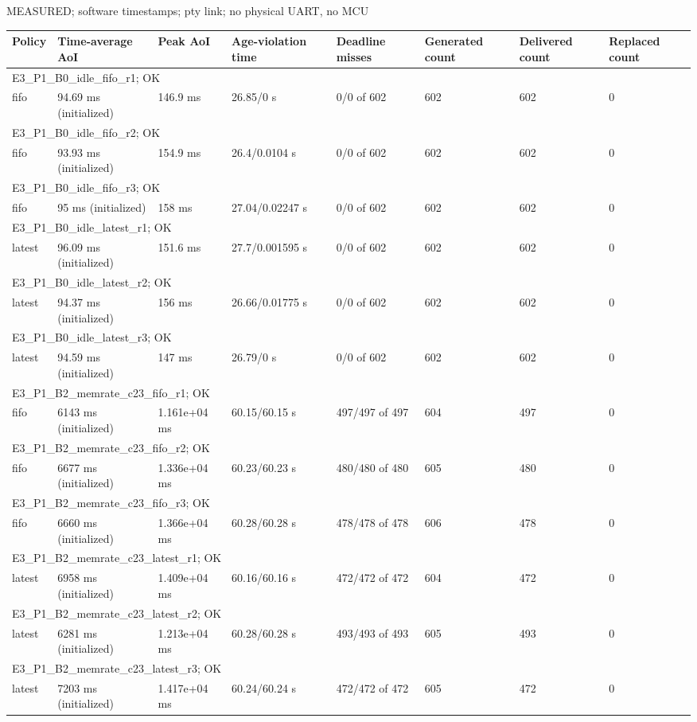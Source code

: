 \par\noindent MEASURED; software timestamps; pty link; no physical UART, no MCU\par
\begin{tabular}{llllllll}
\toprule
Policy & Time-average AoI & Peak AoI & Age-violation time & Deadline misses & Generated count & Delivered count & Replaced count \\
\midrule
\multicolumn{8}{l}{E3\_P1\_B0\_idle\_fifo\_r1; OK} \\
fifo & 94.69 ms (initialized) & 146.9 ms & 26.85/0 s & 0/0 of 602 & 602 & 602 & 0 \\
\multicolumn{8}{l}{E3\_P1\_B0\_idle\_fifo\_r2; OK} \\
fifo & 93.93 ms (initialized) & 154.9 ms & 26.4/0.0104 s & 0/0 of 602 & 602 & 602 & 0 \\
\multicolumn{8}{l}{E3\_P1\_B0\_idle\_fifo\_r3; OK} \\
fifo & 95 ms (initialized) & 158 ms & 27.04/0.02247 s & 0/0 of 602 & 602 & 602 & 0 \\
\multicolumn{8}{l}{E3\_P1\_B0\_idle\_latest\_r1; OK} \\
latest & 96.09 ms (initialized) & 151.6 ms & 27.7/0.001595 s & 0/0 of 602 & 602 & 602 & 0 \\
\multicolumn{8}{l}{E3\_P1\_B0\_idle\_latest\_r2; OK} \\
latest & 94.37 ms (initialized) & 156 ms & 26.66/0.01775 s & 0/0 of 602 & 602 & 602 & 0 \\
\multicolumn{8}{l}{E3\_P1\_B0\_idle\_latest\_r3; OK} \\
latest & 94.59 ms (initialized) & 147 ms & 26.79/0 s & 0/0 of 602 & 602 & 602 & 0 \\
\multicolumn{8}{l}{E3\_P1\_B2\_memrate\_c23\_fifo\_r1; OK} \\
fifo & 6143 ms (initialized) & 1.161e+04 ms & 60.15/60.15 s & 497/497 of 497 & 604 & 497 & 0 \\
\multicolumn{8}{l}{E3\_P1\_B2\_memrate\_c23\_fifo\_r2; OK} \\
fifo & 6677 ms (initialized) & 1.336e+04 ms & 60.23/60.23 s & 480/480 of 480 & 605 & 480 & 0 \\
\multicolumn{8}{l}{E3\_P1\_B2\_memrate\_c23\_fifo\_r3; OK} \\
fifo & 6660 ms (initialized) & 1.366e+04 ms & 60.28/60.28 s & 478/478 of 478 & 606 & 478 & 0 \\
\multicolumn{8}{l}{E3\_P1\_B2\_memrate\_c23\_latest\_r1; OK} \\
latest & 6958 ms (initialized) & 1.409e+04 ms & 60.16/60.16 s & 472/472 of 472 & 604 & 472 & 0 \\
\multicolumn{8}{l}{E3\_P1\_B2\_memrate\_c23\_latest\_r2; OK} \\
latest & 6281 ms (initialized) & 1.213e+04 ms & 60.28/60.28 s & 493/493 of 493 & 605 & 493 & 0 \\
\multicolumn{8}{l}{E3\_P1\_B2\_memrate\_c23\_latest\_r3; OK} \\
latest & 7203 ms (initialized) & 1.417e+04 ms & 60.24/60.24 s & 472/472 of 472 & 605 & 472 & 0 \\
\bottomrule
\end{tabular}
